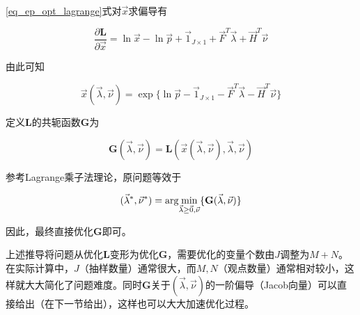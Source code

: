 \ref{eq_ep_opt_lagrange}式对$\vec{x}$求偏导有

\begin{equation}
    \frac{\partial \mathbf{L}}{\partial \vec{x}} = \ln\vec{x}-\ln\vec{p} + \vec{1}_{J\times 1} + \vec{F}^T\vec{\lambda} + \vec{H}^T\vec{\nu}
\end{equation}

由此可知

\begin{equation}\label{eq_x_lbd_nu}
    \vec{x}(\vec{\lambda},\vec{\nu}) = \exp\Big\{\ln\vec{p} - \vec{1}_{J\times 1} - \vec{F}^T\vec{\lambda} - \vec{H}^T\vec{\nu}\Big\}
\end{equation}

定义$\mathbf{L}$的共轭函数$\mathbf{G}$为

\begin{equation}
    \mathbf{G}(\vec{\lambda},\vec{\nu}) = \mathbf{L}(\vec{x}(\vec{\lambda}, \vec{\nu}), \vec{\lambda}, \vec{\nu})
\end{equation}

参考Lagrange乘子法理论，原问题等效于

\begin{equation}\label{eq_ep_opt_dual}
    (\vec{\lambda}^*,\vec{\nu}^*) = \arg\!\min_{\vec{\lambda}\geq \vec{0}, \vec{\nu}} \{\mathbf{G}(\vec{\lambda},\vec{\nu})\}
\end{equation}

因此，最终直接优化$\mathbf{G}$即可。

上述推导将问题从优化$\mathbf{L}$变形为优化$\mathbf{G}$，需要优化的变量个数由$J$调整为$M+N$。在实际计算中，$J$（抽样数量）通常很大，而$M,N$（观点数量）通常相对较小，这样就大大简化了问题难度。同时$\mathbf{G}$关于$(\vec{\lambda}, \vec{\nu})$的一阶偏导（Jacob向量）可以直接给出（在下一节给出），这样也可以大大加速优化过程。
